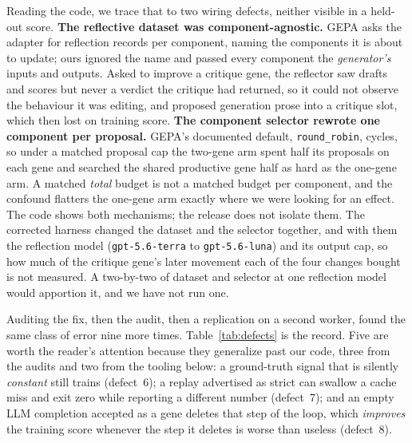 \documentclass[11pt]{article}
\begin{document}
Reading the code, we trace that to two wiring defects, neither visible in a held-out score.
\textbf{The reflective dataset was component-agnostic.} GEPA asks the adapter for reflection
records per component, naming the components it is about to update; ours ignored the name and
passed every component the \emph{generator's} inputs and outputs. Asked to
improve a critique gene, the reflector saw drafts and scores but never a verdict the critique
had returned, so it could not observe the behaviour it was editing, and proposed generation prose into a critique slot, which then lost on training score. \textbf{The
component selector rewrote one component per proposal.} GEPA's documented default,
\texttt{round\_robin}, cycles, so under a matched proposal cap the two-gene arm spent half its proposals on each gene
and searched the shared productive gene half as hard as the one-gene arm. A matched
\emph{total} budget is not a matched budget per component, and the confound flatters the
one-gene arm exactly where we were looking for an effect.
The code shows both mechanisms; the release does not isolate them. The corrected harness changed
the dataset and the selector together, and with them the reflection model (\texttt{gpt-5.6-terra}
to \texttt{gpt-5.6-luna}) and its output cap, so how much of the critique gene's later movement
each of the four changes bought is not measured. A two-by-two of dataset and selector at one
reflection model would apportion it, and we have not run one.

Auditing the fix, then the audit, then a replication on a second worker,
found the same class of error nine more times.
Table~\ref{tab:defects} is the record. Five are worth the reader's attention because they
generalize past our code, three from the audits and two from the tooling below: a ground-truth signal that is silently \emph{constant} still trains
(defect~6); a replay advertised as strict can swallow a cache miss and exit zero while
reporting a different number (defect~7); and an empty LLM completion accepted as a gene
deletes that step of the loop, which \emph{improves} the training score whenever the step it
deletes is worse than useless (defect~8).
\end{document}
